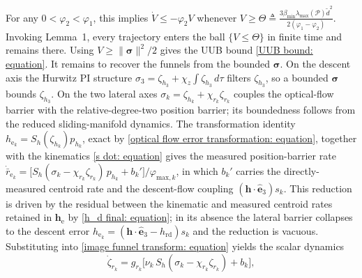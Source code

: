 \documentclass{IEEEtaes}
\begin{document}
For any $0<\varphi_2<\varphi_1$, this implies $\dot{V}\le-\varphi_2 V$ whenever $V\ge\Theta\triangleq \tfrac{3\beta_{\min}\lambda_{\max}(\mathcal{P})\tilde{d}^2}{2(\varphi_1-\varphi_2)}$. Invoking Lemma~1, every trajectory enters the ball $\{V\le\Theta\}$ in finite time and remains there. Using $V\ge\|\boldsymbol{\sigma}\|^2/2$ gives the UUB bound \eqref{UUB bound: equation}. It remains to recover the funnels from the bounded $\boldsymbol{\sigma}$. On the descent axis the Hurwitz PI structure $\sigma_3=\zeta_{h_3}+\chi_z\!\int\zeta_{h_3}\,d\tau$ filters $\zeta_{h_3}$, so a bounded $\boldsymbol{\sigma}$ bounds $\zeta_{h_3}$. On the two lateral axes $\sigma_k=\zeta_{h_k}+\chi_{r_k}\zeta_{r_k}$ couples the optical-flow barrier with the relative-degree-two position barrier; its boundedness follows from the reduced sliding-manifold dynamics. The transformation identity $h_{\text{e}_k}=S_h(\zeta_{h_k})p_{h_k}$, exact by \eqref{optical flow error transformation: equation}, together with the kinematics \eqref{s dot: equation} gives the measured position-barrier rate $\dot{\bar{r}}_{\text{e}_k}=\big[S_h(\sigma_k-\chi_{r_k}\zeta_{r_k})\,p_{h_k}+b_k'\big]/\varphi_{\text{max},k}$, in which $b_k'$ carries the directly-measured centroid rate and the descent-flow coupling $(\boldsymbol{h}\cdot\hat{\boldsymbol{e}}_3)s_k$. This reduction is driven by the residual between the kinematic and measured centroid rates retained in $\boldsymbol{h}_\text{e}$ by \eqref{h_d final: equation}; in its absence the lateral barrier collapses to the descent error $h_{\text{e}_k}=(\boldsymbol{h}\cdot\hat{\boldsymbol{e}}_3-h_\text{rd})s_k$ and the reduction is vacuous. Substituting into \eqref{image funnel transform: equation} yields the scalar dynamics
\begin{equation*}
    \dot{\zeta}_{r_k}=g_{r_k}\big[\nu_k\,S_h(\sigma_k-\chi_{r_k}\zeta_{r_k})+b_k\big],
\end{equation*}
\end{document}
